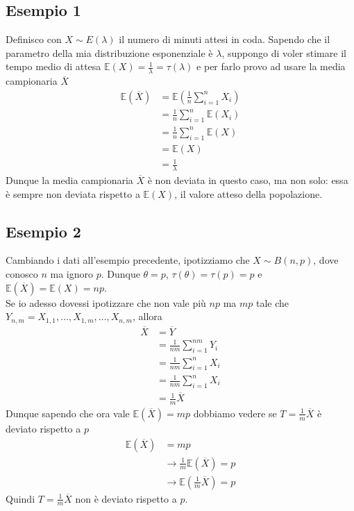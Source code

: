 \documentclass[11pt]{report}
\begin{document}
\subsection{Esempio 1}
Definisco con $X \sim E(\lambda)$ il numero di minuti attesi in coda. Sapendo che il parametro della mia distribuzione esponenziale è $\lambda$, suppongo di voler stimare il tempo medio di attesa $\mathbb{E}(X) = \frac{1}{\lambda} = \tau(\lambda)$ e per farlo provo ad usare la media campionaria $\overline{X}$
\begin{equation}
    \begin{split}
        \mathbb{E}(\overline{X}) & = \mathbb{E} \left( \frac{1}{n} \sum_{i=1}^n X_i \right)\\
        & = \frac{1}{n} \sum_{i=1}^n \mathbb{E}(X_i)\\
        & = \frac{1}{n} \sum_{i=1}^n \mathbb{E}(X)\\
        & = \mathbb{E}(X)\\
        & = \frac{1}{\lambda}
    \end{split}
\end{equation}
Dunque la media campionaria $\overline{X}$ è non deviata in questo caso, ma non solo: essa è sempre non deviata rispetto a $\mathbb{E}(X)$, il valore atteso della popolazione.
\subsection{Esempio 2}
Cambiando i dati all'esempio precedente, ipotizziamo che $X \sim B(n,p)$, dove conosco $n$ ma ignoro $p$. Dunque $\theta = p$, $\tau(\theta) = \tau(p) = p$ e $\mathbb{E}(\overline{X}) = \mathbb{E}(X) = np$.\\
Se io adesso dovessi ipotizzare che non vale più $np$ ma $mp$ tale che $Y_{n,m} = X_{1,1}, \dots, X_{1,m}, \dots, X_{n,m}$, allora
\begin{equation}
	\begin{split}
		\overline{X} & = \overline{Y}\\
		& = \frac{1}{nm} \sum_{i=1}^{nm} Y_i\\
		& = \frac{1}{nm} \sum_{i=1}^{n} X_i\\
		& = \frac{1}{nm} \sum_{i=1}^{n} X_i\\
		& = \frac{1}{m} \overline{X}
	\end{split}
\end{equation}
Dunque sapendo che ora vale $\mathbb{E}(\overline{X}) = mp$ dobbiamo vedere se $T = \frac{1}{m} \overline{X}$ è deviato rispetto a $p$
\begin{equation}
	\begin{split}
		\mathbb{E}(\overline{X}) & = mp\\
		& \rightarrow \frac{1}{m} \mathbb{E}(\overline{X}) = p\\
		& \rightarrow \mathbb{E} \left(\frac{1}{m} \overline{X} \right) = p
	\end{split}
\end{equation}
Quindi $T = \frac{1}{m} \overline{X}$ non è deviato rispetto a $p$.
\end{document}
